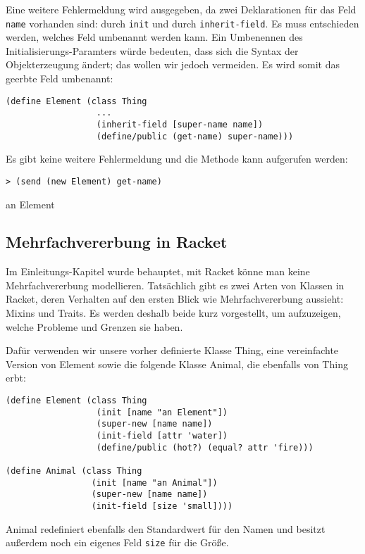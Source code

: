 Eine weitere Fehlermeldung wird ausgegeben, da zwei Deklarationen für das Feld \texttt{name} vorhanden sind: durch \texttt{init} und durch \texttt{inherit-field}. Es muss entschieden werden, welches Feld umbenannt werden kann. Ein Umbenennen des Initialisierungs-Paramters würde bedeuten, dass sich die Syntax der Objekterzeugung ändert; das wollen wir jedoch vermeiden. Es wird somit das geerbte Feld umbenannt:

\begin{lstlisting}
(define Element (class Thing 
                  ...
                  (inherit-field [super-name name])
                  (define/public (get-name) super-name)))
\end{lstlisting}

Es gibt keine weitere Fehlermeldung und die Methode kann aufgerufen werden:

\begin{lstlisting}
> (send (new Element) get-name)
\end{lstlisting}
{\routput {\qq}an Element\qq}

\subsection{Mehrfachvererbung in Racket}
\label{mixins}
Im Einleitungs-Kapitel wurde behauptet, mit Racket könne man keine Mehrfachvererbung modellieren. Tatsächlich gibt es zwei Arten von Klassen in Racket, deren Verhalten auf den ersten Blick wie Mehrfachvererbung aussieht: Mixins und Traits. Es werden deshalb beide kurz vorgestellt, um aufzuzeigen, welche Probleme und Grenzen sie haben.

Dafür verwenden wir unsere vorher definierte Klasse Thing, eine vereinfachte Version von Element sowie die folgende Klasse Animal, die ebenfalls von Thing erbt:

\begin{lstlisting}
(define Element (class Thing 
                  (init [name "an Element"])
                  (super-new [name name])
                  (init-field [attr 'water])
                  (define/public (hot?) (equal? attr 'fire)))

(define Animal (class Thing
                 (init [name "an Animal"])
                 (super-new [name name])
                 (init-field [size 'small])))
\end{lstlisting}

Animal redefiniert ebenfalls den Standardwert für den Namen und besitzt außerdem noch ein eigenes Feld \texttt{size} für die Größe.

